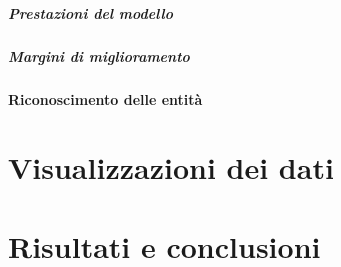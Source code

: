 \documentclass[12pt, a4paper, twocolumn]{article} %
\begin{document}
\subsubsection{Prestazioni del modello}

\subsubsection{Margini di miglioramento}

\subsection{Riconoscimento delle entità}

\hfill
\newpage
\part{Visualizzazioni dei dati}

\hfill
\newpage
\part{Risultati e conclusioni}




\hfill
\newpage
\printbibliography[title={Bibliografia}]

\end{document}
